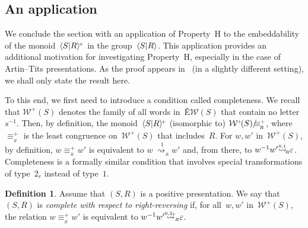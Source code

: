 \documentclass{amsart}
\numberwithin{equation}{section}
\theoremstyle{plain}
\theoremstyle{definition}
\newtheorem{defi}[prop]{Definition}
\begin{document}
\subsection{An application}
\label{SS:Embed}

We conclude the section with an application of Property~${\mathrm{H}}$ to the embeddability of the monoid~${\langle{S}{\mid}\nobreak{R}\rangle^{\!\scriptscriptstyle+}}$ in the group~${\langle{S}{\mid}\nobreak{R}\rangle}$. This application provides an additional motivation for investigating Property~${\mathrm{H}}$, especially in the case of Artin--Tits presentations. As the proof appears in~\cite{Dia} (in a slightly different setting), we shall only state the result here. 

To this end, we first need to introduce a condition called completeness. We recall that ${\mathcal{W}^{\scriptscriptstyle+}\!({S})}$ denotes the family of all words in~Ê${\mathcal{W}({S})}$ that contain no letter~${s}{^{-1}}$. Then, by definition, the monoid~${\langle{S}{\mid}\nobreak{R}\rangle^{\!\scriptscriptstyle+}}$ (isomorphic to) ${\mathcal{W}^{\scriptscriptstyle+}\!({S})} {{/}\hspace{-0.7ex}} {\equiv_{{\!{}_{R}}}^{\scriptscriptstyle+}}$, where ${\equiv_{{\!{}_{R}}}^{\scriptscriptstyle+}}$ is the least congruence on~${\mathcal{W}^{\scriptscriptstyle+}\!({S})}$ that includes~${R}$. For ${w}, {w}'$ in~${\mathcal{W}^{\scriptscriptstyle+}\!({S})}$, by definition, ${w} {\equiv_{{\!{}_{R}}}^{\scriptscriptstyle+}} {w}'$ is equivalent to ${w} {\mathrel{\overset{1}{\ \rightsquigarrow_{{\!{}_{R}}}}}} {w}'$ and, from there, to ${w}{^{-1}} {w}' {\mathrel{{\mathrel{\overset{\scriptscriptstyle 0,1}{\rightsquigarrow}}}_{\hspace{-0.4ex}{\scriptscriptstyle R}}}} {\varepsilon}$. Completeness is a formally similar condition that involves special transformations of type~$2{_{r}}$ instead of type~$1$. 

\begin{defi} \cite{Dgp, Dia}
\label{D:Completeness}
Assume that $({S}, {R})$ is a positive presentation. We say that $({S}, {R})$ is \emph{complete with respect to right-reversing} if, for all~${w}, {w}'$ in~${\mathcal{W}^{\scriptscriptstyle+}\!({S})}$, the relation ${w} {\equiv_{{\!{}_{R}}}^{\scriptscriptstyle+}} {w}'$ is equivalent to ${w}{^{-1}} {w}' {\overset{{}_{{0,2{_{r}}}}}{\rightsquigarrow}_{\hspace{-0.4ex}{\scriptscriptstyle R}}} {\varepsilon}$.
\end{defi}
\end{document}
